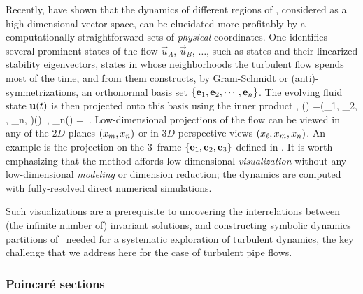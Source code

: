 Recently, \cite{GHCW07} have shown that the dynamics of different regions
of {\statesp}, considered as a high-dimensional vector space,
can be elucidated more profitably by a computationally
straight\-forward sets of \emph{physical} coordinates. One identifies
several prominent states of the flow $\vec{u}_A$, $\vec{u}_B$, $\dots$, such as
{\eqv} states and their linearized stability eigenvectors, states in whose neighborhoods the
turbulent flow spends most of the time, and from them constructs, by
Gram-Schmidt or (anti)-symmetrizations, an orthonormal basis set
$\{{\bf e}_1, {\bf e}_2, \cdots, {\bf e}_n\}$. The evolving fluid state ${\bf u}(t)$
is then projected onto this basis using the inner product
,
\beq
\ssp(\zeit) =(\ssp_1, \ssp_2, \cdots, \ssp_n, \cdots)(\zeit)
    \,,\qquad
\ssp_n(\zeit) = 
\,.
Low-dimensional projections of the flow can be viewed in any of the $2D$ planes
$(x_m, x_n)$ or in $3D$ perspective views $(x_{\ell},x_m,
x_n)$. An example is the  projection on
the $3$\dmn\ frame $\{{{\bf e}}_1,{{\bf e}}_2,{{\bf e}}_3\}$ defined in .
It is worth emphasizing that the method affords low-dimensional {\em
visualization} without any low-dimensional {\em modeling} or dimension
reduction; the dynamics are computed with fully-resolved direct numerical
simulations.

Such visualizations are a prerequisite to uncovering the
interrelations between (the infinite number of) invariant solutions, and
constructing symbolic dynamics partitions of \statesp\ needed for a
systematic exploration of turbulent dynamics, the key challenge that we
address here for the case of turbulent pipe flows.

\subsubsection{Poincar\'e sections}
\label{s:PoincSecFlot}

